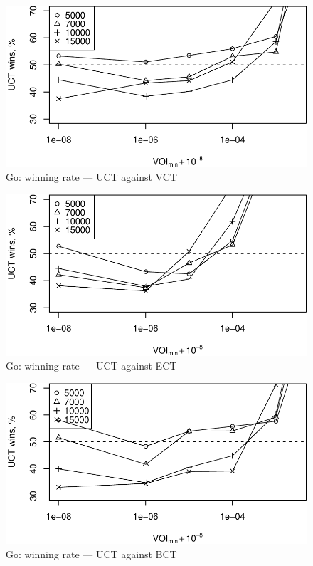 \documentclass{article}
\begin{document}
\begin{figure}[h]
\centering
\includegraphics[scale=0.8]{vct-wins.pdf}
\caption{Go: winning rate --- UCT against VCT}
\label{fig:uct-against-vct}
\end{figure}

\begin{figure}[h]
\centering
\includegraphics[scale=0.8]{ect-wins.pdf}
\caption{Go: winning rate --- UCT against ECT}
\label{fig:uct-against-ect}
\end{figure}

\begin{figure}[h]
\centering
\includegraphics[scale=0.8]{bct-wins.pdf}
\caption{Go: winning rate --- UCT against BCT}
\label{fig:uct-against-bct}
\end{figure}
\end{document}
